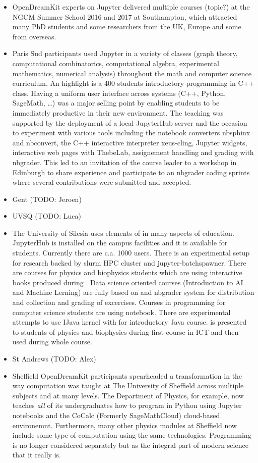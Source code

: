 \documentclass{deliverablereport}
\begin{document}
\begin{itemize}
\item
  OpenDreamKit experts on Jupyter delivered multiple courses (topic?) at
  the NGCM Summer School 2016 and 2017 at Southampton, which attracted
  many PhD students and some researchers from the UK, Europe and some
  from overseas.
\item
  Paris Sud participants used Jupyter in a variety of classes (graph
  theory, computational combinatorics, computational algebra,
  experimental mathematics, numerical analysis) throughout the math and
  computer science curriculum. An highlight is a 400 students
  introductory programming in C++ class. Having a uniform user interface
  across systems (C++, Python, SageMath, \ldots) was a major selling
  point by enabling students to be immediately productive in their new
  environment. The teaching was supported by the deployment of a local
  JupyterHub server and the occasion to experiment with various tools
  including the notebook converters nbsphinx and nbconvert, the C++
  interactive interpreter xeus-cling, Jupyter widgets, interactive web
  pages with ThebeLab, assignement handling and grading with nbgrader.
  This led to an invitation of the course leader to a workshop in
  Edinburgh to share experience and participate to an nbgrader coding
  sprints where several contributions were submitted and accepted.
\item
  Gent (TODO: Jeroen)
\item
  UVSQ (TODO: Luca)
\item
  The University of Silesia uses elements of \ODK in many aspects of
  education. JupyterHub is installed on the campus facilities and it
  is available for students. Currently there are c.a. 1000
  users. There is an experimental setup for research backed by slurm
  HPC cluster and jupyter-batchspawner. There are courses for physics
  and biophysics students which are using interactive books produced
  during \ODK. Data science oriented courses (Introduction to AI and
  Machine Lerning) are fully based on \Jupyter and nbgrader system for
  distribution and collection and grading of excercises. Courses in
  \Python programming for computer science students are using \Jupyter
  notebook. There are experimental attempts to use IJava kernel with
  \Jupyter for introductory Java course. \SageMath is presented to
  students of physics and biophysics during first course in ICT and
  then used during whole course. 
\item
  St Andrews (TODO: Alex)
\item
  Sheffield OpenDreamKit participants spearheaded a transformation in
  the way computation was taught at The University of Sheffield across
  multiple subjects and at many levels. The Department of Physics, for
  example, now teaches \emph{all} of its undergraduates how to program
  in Python using Jupyter notebooks and the CoCalc (Formerly
  SageMathCloud) cloud-based environemnt. Furthermore, many other
  physics modules at Sheffield now include some type of computation
  using the same technologies. Programming is no longer considered
  separately but as the integral part of modern science that it really
  is.


\end{itemize}
\end{document}

